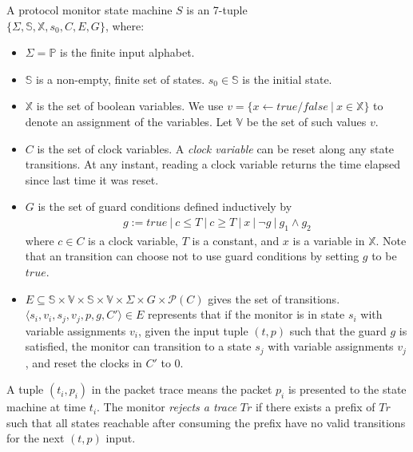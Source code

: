 \begin{definition}
  A protocol monitor state machine $S$ is an 7-tuple\\
  $\{\Sigma, \mathbb{S}, \mathbb{X}, s_0, C, E, G\}$, where:
  \begin{itemize}
    \item $\Sigma = \mathbb{P}$ is the finite input alphabet.

    \item $\mathbb{S}$ is a non-empty, finite set of states. $s_0 \in
      \mathbb{S}$ is the initial state.

    \item $\mathbb{X}$ is the set of boolean variables. We use $v = \{x
      \leftarrow true/false\ |\ x \in \mathbb{X}\}$ to denote an assignment of
      the variables. Let $\mathbb{V}$ be the set of such values $v$. 

    \item $C$ is the set of clock variables. A \textit{clock variable} can be
      reset along any state transitions. At any instant, reading a clock
      variable returns the time elapsed since last time it was reset.

    \item $G$ is the set of guard conditions defined inductively by
      \begin{align*}
        g := true\ |\ c \le T\ |\ c \ge T\ |\ x\ |\ \neg g\ |\ g_1 \land g_2
      \end{align*}%
      where $c \in C$ is a clock variable, $T$ is a constant, and $x$ is a variable in $\mathbb{X}$. 
      Note that an
      transition can choose not to use guard conditions by setting $g$ to be $true$.

    \item $E \subseteq \mathbb{S} \times \mathbb{V} \times \mathbb{S} \times
      \mathbb{V} \times \Sigma \times  G \times \mathscr{P}(C)$ gives the set of
      transitions.\\ $\langle s_i, v_i, s_j, v_j, p, g, C'\rangle \in E$
      represents that if the monitor is in state $s_i$ with variable assignments
      $v_i$, given the input tuple $(t, p)$ such that the guard $g$ is
      satisfied, the monitor can transition to a state $s_j$ with variable assignments
      $v_j$, and reset the clocks in $C'$ to 0.
  \end{itemize}
  \label{def:sm}
\end{definition}

A tuple $(t_i, p_i)$ in the packet trace means the packet $p_i$ is presented to
the state machine at time $t_i$. The monitor {\it rejects a trace} $Tr$ if there
exists a prefix of $Tr$ such that all states reachable after consuming the
prefix have no valid transitions for the next $(t, p)$ input.

